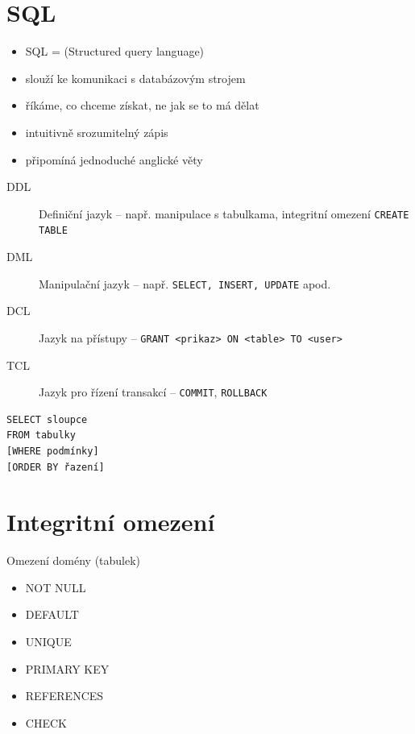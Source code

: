 \documentclass{szzclass}
\begin{document}
\section{SQL}
\begin{itemize}
  \item SQL = (Structured query language) 
  \item slouží ke komunikaci s databázovým strojem
  \item říkáme, co chceme získat, ne jak se to má dělat
  \item intuitivně srozumitelný zápis
  \item připomíná jednoduché anglické věty
\end{itemize}

\begin{description}
  \item[DDL] Definiční jazyk -- např. manipulace s tabulkama, integritní omezení \texttt{CREATE TABLE}
  \item[DML] Manipulační jazyk -- např. \texttt{SELECT, INSERT, UPDATE} apod.
  \item[DCL] Jazyk na přístupy -- \texttt{GRANT <prikaz> ON <table> TO <user>}
  \item[TCL] Jazyk pro řízení transakcí -- \texttt{COMMIT}, \texttt{ROLLBACK}
\end{description}

\begin{verbatim}
SELECT sloupce
FROM tabulky
[WHERE podmínky]
[ORDER BY řazení]
\end{verbatim}

\section{Integritní omezení}
Omezení domény (tabulek)
\begin{itemize}
  \item NOT NULL
  \item DEFAULT
  \item UNIQUE
  \item PRIMARY KEY
  \item REFERENCES
  \item CHECK
\end{itemize}
\end{document}
